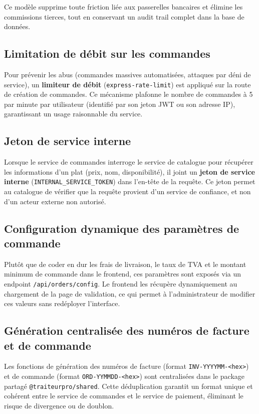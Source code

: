 Ce modèle supprime toute friction liée aux passerelles bancaires et élimine les commissions tierces, tout en conservant un audit trail complet dans la base de données.

\subsection{Limitation de débit sur les commandes}

Pour prévenir les abus (commandes massives automatisées, attaques par déni de service), un \textbf{limiteur de débit} (\texttt{express-rate-limit}) est appliqué sur la route de création de commandes. Ce mécanisme plafonne le nombre de commandes à 5 par minute par utilisateur (identifié par son jeton JWT ou son adresse IP), garantissant un usage raisonnable du service.

\subsection{Jeton de service interne}

Lorsque le service de commandes interroge le service de catalogue pour récupérer les informations d'un plat (prix, nom, disponibilité), il joint un \textbf{jeton de service interne} (\texttt{INTERNAL\_SERVICE\_TOKEN}) dans l'en-tête de la requête. Ce jeton permet au catalogue de vérifier que la requête provient d'un service de confiance, et non d'un acteur externe non autorisé.

\subsection{Configuration dynamique des paramètres de commande}

Plutôt que de coder en dur les frais de livraison, le taux de TVA et le montant minimum de commande dans le frontend, ces paramètres sont exposés via un endpoint \texttt{/api/orders/config}. Le frontend les récupère dynamiquement au chargement de la page de validation, ce qui permet à l'administrateur de modifier ces valeurs sans redéployer l'interface.

\subsection{Génération centralisée des numéros de facture et de commande}

Les fonctions de génération des numéros de facture (format \texttt{INV-YYYYMM-<hex>}) et de commande (format \texttt{ORD-YYMMDD-<hex>}) sont centralisées dans le package partagé \texttt{@traiteurpro/shared}. Cette déduplication garantit un format unique et cohérent entre le service de commandes et le service de paiement, éliminant le risque de divergence ou de doublon.

